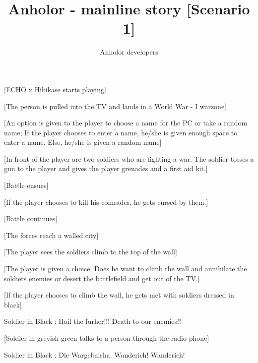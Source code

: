 \documentclass[a4paper,12pt]{report}
\title {Anholor - mainline story [Scenario 1]}
\author {Anholor developers}
\begin{document}
\newline

[ECHO x Hibikase starts playing]\newline

[The person is pulled into the TV and lands in a World War - I warzone]\newline

[An option is given to the player to choose a name for the PC or take a random name; If the player chooses to enter a name, he/she is given enough space to enter a name. Else, he/she is given a random name]\newline

[In front of the player are two soldiers who are fighting a war. The soldier tosses a gun to the player and gives the player grenades and a first aid kit.]\newline

[Battle ensues]\newline

[If the player chooses to kill his comrades, he gets cursed by them.]\newline

[Battle continues]\newline

[The forces reach a walled city]\newline

[The player sees the soldiers climb to the top of the wall]\newline

[The player is given a choice. Does he want to climb the wall and annihilate the soldiers enemies or desert the battlefield and get out of the TV.]\newline

[If the player chooses to climb the wall, he gets met with soldiers dressed in black]\newline

Soldier in Black : Hail the furher!!! Death to our enemies!!\newline

[Soldier in greyish green talks to a person through the radio phone]\newline

Soldier in Black : Die Wargebaisha. Wanderich! Wanderich!\newline
\end{document}
